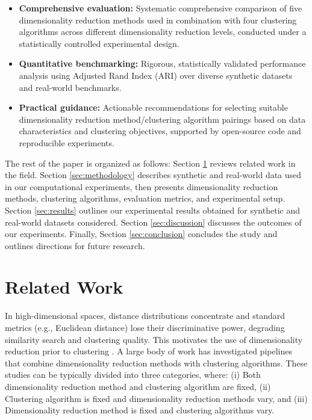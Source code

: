 \documentclass[preprint,12pt]{elsarticle}
\begin{document}
\begin{itemize}
    \item \textbf{Comprehensive evaluation:} Systematic comprehensive comparison of five dimensionality reduction methods used in combination with four clustering algorithms across different dimensionality reduction levels, conducted under a statistically controlled experimental design.
    \item \textbf{Quantitative benchmarking:} Rigorous, statistically validated performance analysis using Adjusted Rand Index (ARI) over diverse synthetic datasets and real-world benchmarks.
    \item \textbf{Practical guidance:} Actionable recommendations for selecting suitable dimensionality reduction method/clustering algorithm pairings based on data characteristics and clustering objectives, supported by open-source code and reproducible experiments.
\end{itemize}

The rest of the paper is organized as follows: Section \ref{sec:related_work} reviews related work in the field. Section \ref{sec:methodology} describes synthetic and real-world data used in our computational experiments, then presents dimensionality reduction methods, clustering algorithms, evaluation metrics, and experimental setup. Section \ref{sec:results} outlines our experimental results obtained for synthetic and real-world datasets considered. Section \ref{sec:discussion} discusses the outcomes of our experiments. Finally, Section \ref{sec:conclusion} concludes the study and outlines directions for future research.

\section{Related Work} \label{sec:related_work}

In high-dimensional spaces, distance distributions concentrate and standard metrics (e.g., Euclidean distance) lose their discriminative power, degrading similarity search and clustering quality. This motivates the use of dimensionality reduction prior to clustering \cite{herrmann2024enhancing,aggarwal2001surprising,beyer1999meaningful}. A large body of work has investigated pipelines that combine dimensionality reduction methods with clustering algorithms. These studies can be typically divided into three categories, where: (i) Both dimensionality reduction method and clustering algorithm are fixed, (ii) Clustering algorithm is fixed and dimensionality reduction methods vary, and (iii) Dimensionality reduction method is fixed and clustering algorithms vary. 
\end{document}
